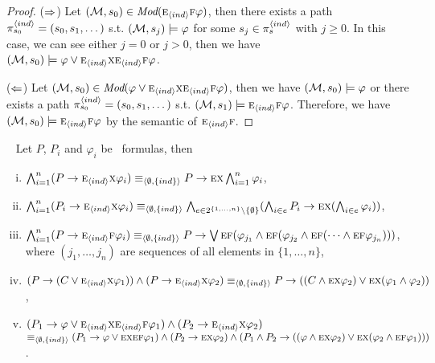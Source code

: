 \documentclass[twoside,11pt]{article}
\begin{document}
	\begin{proof}
		($\Rightarrow$) Let $({\cal M}, s_0) \in \textit{Mod}(\textsc{e}_{{\langle{ind}\rangle}} \textsc{f} \varphi)$, then there exists a path $\pi_{s_0}^{{\langle{ind}\rangle}} = (s_0, s_1, \dots)$ s.t. $({\cal M}, s_j) \models \varphi$ for some $s_j \in \pi_s^{{\langle{ind}\rangle}}$ with $j \ge 0$. In this case, we can see either $j=0$ or $j > 0$, then we have $({\cal M}, s_0) \models  \varphi \vee \textsc{e}_{{\langle{ind}\rangle}} \textsc{x} \textsc{e}_{{\langle{ind}\rangle}}\textsc{f} \varphi$.
		
		($\Leftarrow$) Let $({\cal M}, s_0) \in \textit{Mod}(\varphi \vee \textsc{e}_{{\langle{ind}\rangle}} \textsc{x} \textsc{e}_{{\langle{ind}\rangle}}\textsc{f} \varphi)$, then we have $({\cal M},s_0) \models \varphi$ or there exists a path $\pi_{s_0}^{{\langle{ind}\rangle}} = (s_0, s_1, \dots)$ s.t. $({\cal M}, s_1) \models \textsc{e}_{{\langle{ind}\rangle}}\textsc{f} \varphi$. Therefore, we have $({\cal M}, s_0) \models \textsc{e}_{{\langle{ind}\rangle}} \textsc{f} \varphi$ by the semantic of $\textsc{e}_{{\langle{ind}\rangle}}\textsc{f}$.
	\end{proof}
	
	
	
	\noindent\begin{lemma}~\label{lem:In2NI}
		Let $P$, $P_i$ and $\varphi_i$ be \CTL\ formulas, then
		\begin{enumerate}[(i)]
			\item $\bigwedge_{i=1}^n (P\rightarrow \textsc{e}_{{\langle{ind}\rangle}} \textsc{x} \varphi_i)  \equiv_{{\langle{\emptyset, \{ind\}}\rangle}} P\rightarrow \textsc{e} \textsc{x} \bigwedge_{i=1}^n \varphi_i$,
			\item $\bigwedge_{i=1}^n (P_i\rightarrow \textsc{e}_{{\langle{ind}\rangle}} \textsc{x} \varphi_i) \equiv_{{\langle{\emptyset, \{ind\}}\rangle}} \bigwedge_{e \in 2^{\{1,\dots, n\}} \setminus \{\emptyset\}}(\bigwedge_{i\in e}P_i\rightarrow \textsc{e} \textsc{x} (\bigwedge_{i\in e}\varphi_i))$,
			\item $\bigwedge_{i=1}^n (P\rightarrow \textsc{e}_{{\langle{ind}\rangle}} \textsc{f} \varphi_i)  \equiv_{{\langle{\emptyset, \{ind\}}\rangle}} P\rightarrow \bigvee\textsc{e}\textsc{f} (\varphi_{j_1} \wedge \textsc{e}\textsc{f}(\varphi_{j_2} \wedge \textsc{e}\textsc{f}(\dots \wedge \textsc{e}\textsc{f} \varphi_{j_n})))$, where $(j_1, \dots, j_n)$ are sequences of all elements in $\{1, \dots, n\}$,
			\item $(P\rightarrow (C \vee \textsc{e}_{{\langle{ind}\rangle}} \textsc{x} \varphi_1)) \wedge (P \rightarrow \textsc{e}_{{\langle{ind}\rangle}} \textsc{x} \varphi_2) \equiv_{{\langle{\emptyset, \{ind\}}\rangle}} P \rightarrow ((C \wedge \textsc{e} \textsc{x} \varphi_2) \vee \textsc{e} \textsc{x} (\varphi_1 \wedge \varphi_2))$,
			\item $(P_1 \rightarrow \varphi \vee \textsc{e}_{{\langle{ind}\rangle}}\textsc{x} \textsc{e}_{{\langle{ind}\rangle}}\textsc{f} \varphi_1) \wedge (P_2 \rightarrow \textsc{e}_{{\langle{ind}\rangle}}\textsc{x} \varphi_2)$ $\equiv_{{\langle{\emptyset, \{ind\}}\rangle}} (P_1 \rightarrow \varphi \vee \textsc{e} \textsc{x} \textsc{e} \textsc{f} \varphi_1) \wedge (P_2 \rightarrow \textsc{e} \textsc{x} \varphi_2) \wedge (P_1 \wedge P_2 \rightarrow ((\varphi \wedge \textsc{e} \textsc{x} \varphi_2) \vee \textsc{e} \textsc{x} (\varphi_2 \wedge \textsc{e} \textsc{f} \varphi_1)))$.
		\end{enumerate}
	\end{lemma}
	
\end{document}
